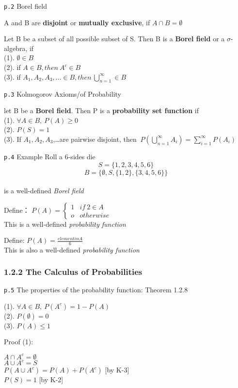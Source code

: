 \documentclass[]{tufte-book}
\begin{document}
\texttt{p.2} Borel field

A and B are \textbf{disjoint} or \textbf{mutually exclusive}, if
\(A\cap B=\emptyset\)

Let B be a subset of all possible subset of S. Then B is a \textbf{Borel
field} or a \(\sigma\)-algebra, if\\
(1). \(\emptyset\in B\)\\
(2). if \(A\in B, then\ A^c\in B\)\\
(3). if
\(A_{1},A_{2},A_{3},...\in B, then\ \bigcup_{n=1}^{\infty}\in B\)

\texttt{p.3} Kolmogorov Axioms/of Probability

let B be a \textbf{Borel field}. Then P is a \textbf{probability set
function} if\\
(1). \(\forall A\in B,\ P(A)\ge0\)\\
(2). \(P(S)=1\)\\
(3). If \(A_{1},A_{2},A_{3}\),\ldots{}are pairwise disjoint, then
\(\ P(\bigcup_{n=1}^{\infty}A_i)=\sum_{i=1}^{\infty}P(A_{i})\)

\texttt{p.4} Example Roll a 6-sides die \[S=\{1,2,3,4,5,6\}\]
\[B=\{\emptyset ,S,\{1,2\},\{3,4,5,6\}\}\]\\
is a well-defined \emph{Borel field}

Define： \(P(A)=\begin{cases}1&if\ 2\in A \\o &otherwise\end{cases}\)\\
This is a well-defined \emph{probability function}

Define: \(P(A)=\frac{element in A}{6}\)\\
This is also a well-defined \emph{probability function}

\hypertarget{the-calculus-of-probabilities}{%
\subsubsection{1.2.2 The Calculus of
Probabilities}\label{the-calculus-of-probabilities}}

\texttt{p.5} The properties of the probability function: Theorem 1.2.8

(1). \(\forall A\in B,\ P(A^c)=1-P(A)\)\\
(2). \(P(\emptyset)=0\)\\
(3). \(P(A)\le1\)

Proof (1):

\(A\cap A^c=\emptyset\)\\
\(A\cup A^c=S\)\\
\(P(A\cup A^c)=P(A)+P(A^c)\) {[}by K-3{]}\\
\(P(S)=1\) {[}by K-2{]}
\end{document}
